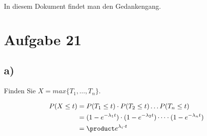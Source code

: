 \documentclass{article}
\begin{document}
	
	In diesem Dokument findet man den Gedankengang.

	\section*{Aufgabe 21}

	\subsection*{a)}
		Finden Sie $ X = max\{ T_1 , \dots , T_n \}$. 

		\begin{align*}
			P(X \leq t) &= P( T_1 \leq t) \cdot P(T_2 \leq t) \dots P(T_n \leq t)\\
			&= (1-e^{-\lambda_1t})\cdot (1-e^{-\lambda_2t}) \dots \cdot (1-e^{-\lambda_nt})\\
			&= \product e^{\lambda_i \cdot t} 
	
		\end{align*}

	
\end{document}
